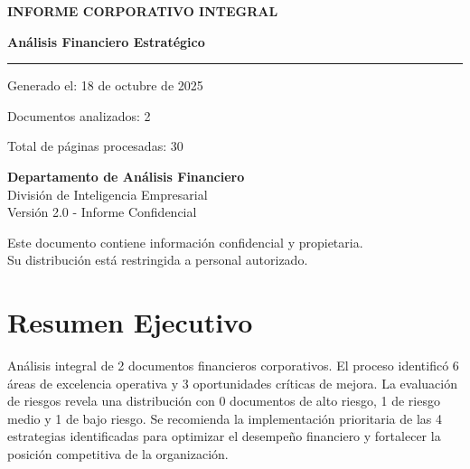 \documentclass[11pt]{report}
\begin{document}
\begin{titlepage}
    \centering
    \vspace*{1cm}
    \vspace{1.5cm}
    
    {\Huge\color{corporate-blue}\textbf{INFORME CORPORATIVO INTEGRAL}}
    \vspace{0.5cm}
    
    {\Large\textbf{Análisis Financiero Estratégico}}
    \vspace{1cm}
    
    \rule{\textwidth}{1pt}
    \vspace{0.5cm}
    
    {\large Generado el: 18 de octubre de 2025}
    \vspace{0.3cm}
    
    {\large Documentos analizados: 2}
    \vspace{0.3cm}
    
    {\large Total de páginas procesadas: 30}
    \vspace{1.5cm}
    
    \begin{minipage}{0.8\textwidth}
    \centering
    \textbf{Departamento de Análisis Financiero}\\
    División de Inteligencia Empresarial\\
    Versión 2.0 - Informe Confidencial
    \end{minipage}
    \vfill
    
    \footnotesize
    Este documento contiene información confidencial y propietaria.\\
    Su distribución está restringida a personal autorizado.
\end{titlepage}

\cleardoublepage 

\tableofcontents
\cleardoublepage


\chapter*{Resumen Ejecutivo}

\begin{tcolorbox}[colback=corporate-gray!30!white, colframe=corporate-blue, title=Resumen Consolidado, fonttitle=\bfseries]
Análisis integral de 2 documentos financieros corporativos. El proceso identificó 6 áreas de excelencia operativa y 3 oportunidades críticas de mejora. La evaluación de riesgos revela una distribución con 0 documentos de alto riesgo, 1 de riesgo medio y 1 de bajo riesgo. Se recomienda la implementación prioritaria de las 4 estrategias identificadas para optimizar el desempeño financiero y fortalecer la posición competitiva de la organización.
\end{tcolorbox}
\end{document}
